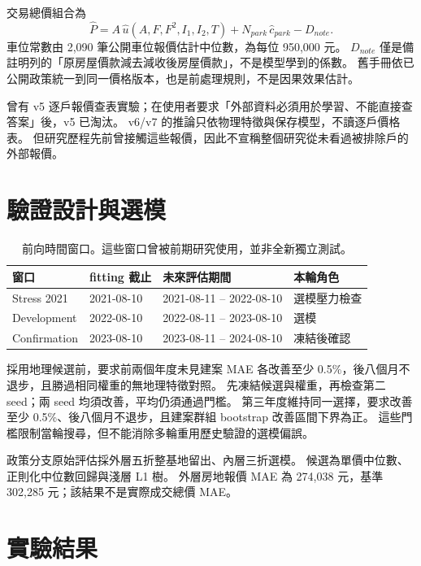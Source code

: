 \documentclass[11pt,a4paper]{article}
\begin{document}
交易總價組合為
\begin{equation}
\hat P=A\,\hat u(A,F,F^2,I_1,I_2,T)+N_{park}\,\hat c_{park}-D_{note}.
\end{equation}
車位常數由 2,090 筆公開車位報價估計中位數，為每位 950,000 元。
\(D_{note}\) 僅是備註明列的「原房屋價款減去減收後房屋價款」，不是模型學到的係數。
舊手冊依已公開政策統一到同一價格版本，也是前處理規則，不是因果效果估計。

曾有 v5 逐戶報價查表實驗；在使用者要求「外部資料必須用於學習、不能直接查答案」後，v5 已淘汰。
v6/v7 的推論只依物理特徵與保存模型，不讀逐戶價格表。
但研究歷程先前曾接觸這些報價，因此不宣稱整個研究從未看過被排除戶的外部報價。

\section{驗證設計與選模}
\begin{table}[H]\centering\small
\begin{tabular}{llll}
\toprule
窗口 & fitting 截止 & 未來評估期間 & 本輪角色\\
\midrule
Stress 2021 & 2021-08-10 & 2021-08-11 -- 2022-08-10 & 選模壓力檢查\\
Development & 2022-08-10 & 2022-08-11 -- 2023-08-10 & 選模\\
Confirmation & 2023-08-10 & 2023-08-11 -- 2024-08-10 & 凍結後確認\\
\bottomrule
\end{tabular}
\caption{前向時間窗口。這些窗口曾被前期研究使用，並非全新獨立測試。}
\end{table}

採用地理候選前，要求前兩個年度未見建案 MAE 各改善至少 0.5\%，後八個月不退步，且勝過相同權重的無地理特徵對照。
先凍結候選與權重，再檢查第二 seed；兩 seed 均須改善，平均仍須通過門檻。
第三年度維持同一選擇，要求改善至少 0.5\%、後八個月不退步，且建案群組 bootstrap 改善區間下界為正。
這些門檻限制當輪搜尋，但不能消除多輪重用歷史驗證的選模偏誤\cite{cawley}。

政策分支原始評估採外層五折整基地留出、內層三折選模。
候選為單價中位數、正則化中位數回歸與淺層 L1 樹。
外層房地報價 MAE 為 274,038 元，基準 302,285 元；該結果不是實際成交總價 MAE。

\section{實驗結果}
\end{document}
